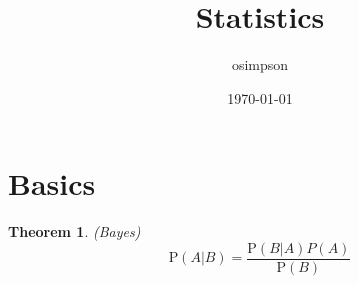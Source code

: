 \documentclass[12pt]{article}
\title{Statistics}
\author{osimpson}
\date{\today}
\newtheorem{theorem}{Theorem}
\newcommand{\Prob}{\mathrm{P}}
\begin{document}
\maketitle

\section{Basics}

\begin{theorem} (Bayes)
    \begin{equation}
        \Prob(A|B) = \frac{\Prob(B|A)P(A)}{\Prob(B)}
    \end{equation}
\end{theorem}
\end{document}

